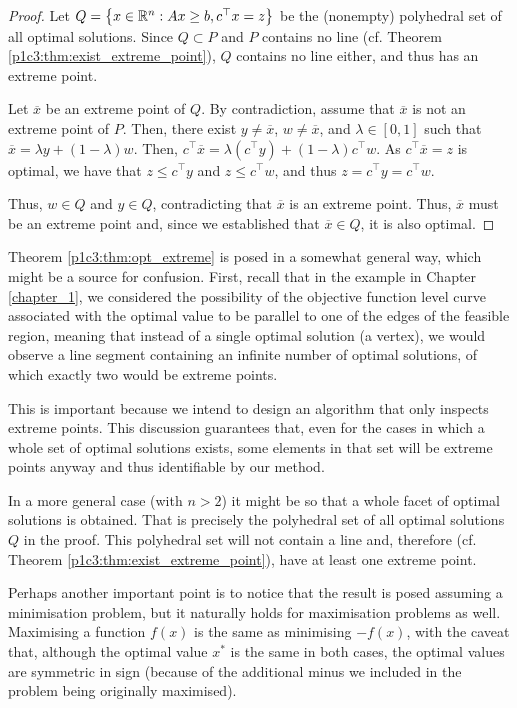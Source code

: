 \begin{proof}
	Let $Q = \left\{ x \in \mathbb{R}^n : Ax \geq b, c^\top x = z \right \}$ be the (nonempty) polyhedral set of all optimal solutions. Since $Q \subset P$ and $P$ contains no line (cf. Theorem \ref{p1c3:thm:exist_extreme_point}), $Q$ contains no line either, and thus has an extreme point.

	Let $\overline{x}$ be an extreme point of $Q$. By contradiction, assume that $\overline{x}$ is not an extreme point of $P$. Then, there exist $y \neq \overline{x}$, $w \neq \overline{x}$, and $\lambda \in [0,1]$ such that $\overline{x} = \lambda y + (1-\lambda)w$. Then, $c^\top \overline{x} = \lambda (c^\top y) + (1-\lambda)c^\top w$. As $c^\top \overline{x} = z$ is optimal, we have that $z \leq c^\top y$ and $z \leq c^\top w$,  and thus $z = c^\top y = c^\top w$. 
	
	Thus, $w \in Q$ and $y \in Q$, contradicting that $\overline{x}$ is an extreme point. Thus, $\overline{x}$ must be an extreme point and, since we established that $\overline{x} \in Q$, it is also optimal. 
\end{proof}

Theorem \ref{p1c3:thm:opt_extreme} is posed in a somewhat general way, which might be a source for confusion. First, recall that in the example in Chapter \ref{chapter_1}, we considered the possibility of the objective function level curve associated with the optimal value to be parallel to one of the edges of the feasible region, meaning that instead of a single optimal solution (a vertex), we would observe a line segment containing an infinite number of optimal solutions, of which exactly two would be extreme points. 

This is important because we intend to design an algorithm that only inspects extreme points. This discussion guarantees that, even for the cases in which a whole set of optimal solutions exists, some elements in that set will be extreme points anyway and thus identifiable by our method.

In a more general case (with $n > 2$) it might be so that a whole facet of optimal solutions is obtained. That is precisely the polyhedral set of all optimal solutions $Q$ in the proof. This polyhedral set will not contain a line and, therefore (cf. Theorem \ref{p1c3:thm:exist_extreme_point}), have at least one extreme point. 

Perhaps another important point is to notice that the result is posed assuming a minimisation problem, but it naturally holds for maximisation problems as well. Maximising a function $f(x)$ is the same as minimising $-f(x)$, with the caveat that, although the optimal value $x^*$ is the same in both cases, the optimal values are symmetric in sign (because of the additional minus we included in the problem being originally maximised).


